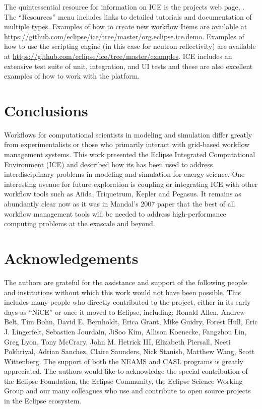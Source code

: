 The quintessential resource for information on ICE is the projects web
page, \cite{billings_eclipse_2016}. The ``Resources'' menu includes links to
detailed tutorials and documentation of multiple types. Examples of how to create
new workflow Items are available at
\url{https://github.com/eclipse/ice/tree/master/org.eclipse.ice.demo}.
Examples of how to use the scripting engine (in this case for neutron
reflectivity) are available at
\url{https://github.com/eclipse/ice/tree/master/examples}. ICE includes an
extensive test suite of unit, integration, and UI tests and these are
also excellent examples of how to work with the platform.

\section{Conclusions}\label{conclusions}

Workflows for computational scientists in modeling and simulation differ
greatly from experimentalists or those who primarily interact with
grid-based workflow management systems. This work presented the Eclipse
Integrated Computational Environment (ICE) and described how its has
been used to address interdisciplinary problems in modeling and
simulation for energy science. One interesting avenue for future
exploration is coupling or integrating ICE with other workflow tools
such as Aiida, Triquetrum, Kepler and Pegasus. It remains as abundantly
clear now as it was in Mandal's 2007 paper that the best of all workflow
management tools will be needed to address high-performance computing
problems at the exascale and beyond.

\section*{Acknowledgements}\label{acknowledgements}

The authors are grateful for the assistance and support of the following
people and institutions without which this work would not have been
possible. This includes many people who directly contributed to the
project, either in its early days as ``NiCE'' or once it moved to
Eclipse, including: Ronald Allen, Andrew Belt, Tim Bohn, David E.
Bernholdt, Erica Grant, Mike Guidry, Forest Hull, Eric J. Lingerfelt,
Sebastien Jourdain, JiSoo Kim, Allison Koenecke, Fangzhou Lin, Greg
Lyon, Tony McCrary, John M. Hetrick III, Elizabeth Piersall, Neeti
Pokhriyal, Adrian Sanchez, Claire Saunders, Nick Stanish, Matthew Wang,
Scott Wittenberg. The support of both the NEAMS and CASL programs is
greatly appreciated. The authors would like to acknowledge the special
contribution of the Eclipse Foundation, the Eclipse Community, the
Eclipse Science Working Group and our many colleagues who use and
contribute to open source projects in the Eclipse ecosystem.

